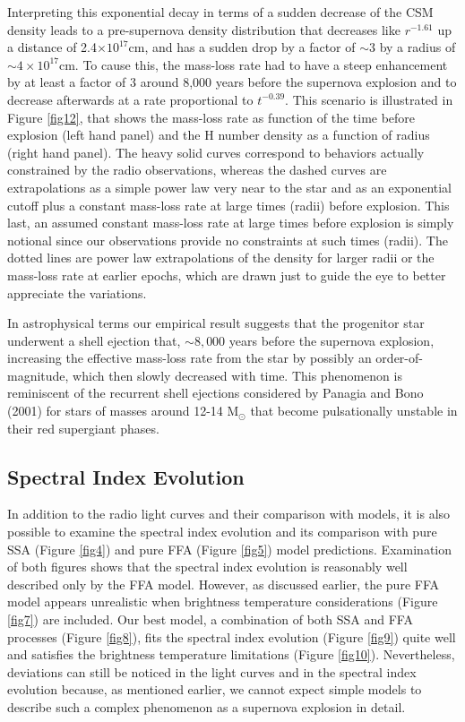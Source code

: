 \documentclass[12pt,preprint]{aastex}
\begin{document}
Interpreting this exponential decay in terms of a sudden decrease of the CSM density leads to a pre-supernova density distribution that decreases like $r^{-1.61}$ up a distance of  2.4$\times 10^{17}$cm, and has a sudden drop by a factor of $\sim3$ by a radius of $\sim 4\times 10^{17}$cm. To cause this, the mass-loss rate had to have a steep enhancement by at least a factor of 3 around 8,000 years before the supernova explosion and to decrease afterwards at a rate proportional to $t^{-0.39}$. This scenario is illustrated in Figure \ref{fig12}, that shows the mass-loss rate as function of the time before explosion (left hand panel) and the H number density as a function of radius (right hand panel). The heavy solid curves correspond to behaviors actually constrained by the radio observations, whereas the dashed curves are extrapolations as a simple power law very near to the star and as an exponential cutoff plus a constant mass-loss rate at large times (radii) before explosion. This last, an assumed constant mass-loss rate at large times before explosion is simply notional since our observations provide no constraints at such times (radii). The dotted lines are power law extrapolations of the density for larger radii or the mass-loss rate at earlier epochs, which are drawn just to guide the eye to better appreciate the variations. 

In astrophysical terms our empirical result suggests that the progenitor star underwent a shell ejection that, $\sim8,000$ years before the supernova explosion, increasing the effective mass-loss rate from the star
by possibly an order-of-magnitude, which then slowly decreased with time. This phenomenon is reminiscent of the recurrent shell ejections considered by Panagia and Bono (2001) for stars of masses around 12-14
M$_\odot$ that become pulsationally unstable in their red supergiant
phases.

\subsection{Spectral Index Evolution \label{SI}}

In addition to the radio light curves and their comparison with models, it is also possible to examine the spectral index evolution and its comparison with pure SSA (Figure \ref{fig4}) and pure FFA (Figure
\ref{fig5}) model predictions. Examination of both figures shows that the spectral index evolution is reasonably well described only by the FFA model. However, as discussed earlier, the pure FFA model appears unrealistic when brightness temperature considerations (Figure \ref{fig7}) are included. Our best model, a combination of both SSA and FFA processes (Figure \ref{fig8}), fits the spectral index evolution (Figure \ref{fig9}) quite well and satisfies the brightness temperature limitations (Figure \ref{fig10}). Nevertheless, deviations can still be noticed in the light curves and in the spectral index evolution because, as mentioned earlier, we cannot expect simple models to describe such a complex phenomenon as a supernova explosion in detail.
\end{document}
